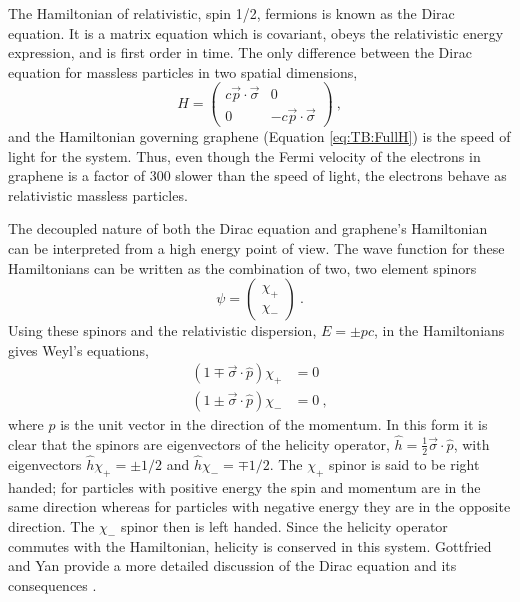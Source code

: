 The Hamiltonian of relativistic, spin 1/2, fermions is known as the Dirac equation.
It is a matrix equation which is covariant, obeys the relativistic energy expression, and is first order in time.
The only difference between the Dirac equation for massless particles in two spatial dimensions,
\begin{equation*}
	H=\left( \begin{array}{cc}
			c \vec{p} \cdot \vec{\sigma}              & 0\\
			0              & -c \vec{p} \cdot \vec{\sigma}			   	            			\end{array} \right) \ ,
\end{equation*}
and the Hamiltonian governing graphene (Equation \ref{eq:TB:FullH}) is the speed of light for the system.
Thus, even though the Fermi velocity of the electrons in graphene is a factor of 300 slower than the speed of light, the electrons behave as relativistic massless particles.

The decoupled nature of both the Dirac equation and graphene's Hamiltonian can be interpreted from a high energy point of view.
The wave function for these Hamiltonians can be written as the combination of two, two element spinors
\begin{equation*}
	\psi=\left( \begin{array}{c} \chi_{+} \\ \chi_{-} \end{array} \right) \ .
\end{equation*}
Using these spinors and the relativistic dispersion, $E=\pm p c$, in the Hamiltonians gives Weyl's equations,
\begin{align*}
	(1 \mp \vec{\sigma} \cdot \hat{p}) \chi_{+}&=0 \\
	(1 \pm \vec{\sigma} \cdot \hat{p}) \chi_{-}&=0 \ ,
\end{align*}
where $\hat{p}$ is the unit vector in the direction of the momentum.
In this form it is clear that the spinors are eigenvectors of the helicity operator, $\hat{h}=\frac{1}{2} \vec{\sigma} \cdot \hat{p}$, with eigenvectors $\hat{h} \chi_+=\pm 1/2$ and $\hat{h} \chi_-=\mp 1/2$.
The $\chi_+$ spinor is said to be right handed; for particles with positive energy the spin and momentum are in the same direction whereas for particles with negative energy they are in the opposite direction.
The $\chi_-$ spinor then is left handed.
Since the helicity operator commutes with the Hamiltonian, helicity is conserved in this system.
Gottfried and Yan provide a more detailed discussion of the Dirac equation and its consequences \cite{Gottfried2003}.

